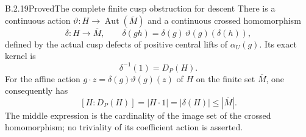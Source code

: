 \begin{result}{B.2.19}{Proved}{The complete finite cusp obstruction for descent}
There is a continuous action $\vartheta:H\to
\operatorname{Aut}(\overline M)$ and a continuous crossed
homomorphism
\[
 \delta:H\longrightarrow\overline M,
       \qquad \delta(gh)=\delta(g)\,
                         \vartheta(g)(\delta(h)),              \tag{B.S27}
\]
defined by the actual cusp defects of positive central
lifts of $\alpha_U(g)$.  Its exact kernel is
\[
                         \delta^{-1}(1)=D_P(H).                 \tag{B.S28}
\]
For the affine action $g\cdot z=\delta(g)\vartheta(g)(z)$
of $H$ on the finite set $\overline M$, one consequently
has
\[
 [H:D_P(H)]=|H\cdot1|=|\delta(H)|\leq|\overline M|.            \tag{B.S29}
\]
The middle expression is the cardinality of the image
set of the crossed homomorphism; no triviality of its
coefficient action is asserted.
\end{result}

